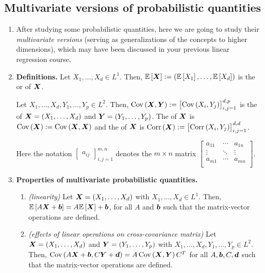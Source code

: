 \subsection{Multivariate versions of probabilistic quantities}
\label{subsect:multivar-prob-quant}
\begin{enumerate}
\item After studying some probabilistic quantities, here we are going to study
their \emph{multivariate versions} (serving as generalizations of the concepts
to higher dimensions), which may have been discussed in your previous linear
regression course.
\item \textbf{Definitions.} Let \(X_1,\dotsc,X_d\in L^{1}\). Then,
\(\mathbb{E}\left[\bm{X}\right]:=(\mathbb{E}\left[X_1\right],\dotsc,\mathbb{E}\left[X_d\right])\) is the 
or  of \(\bm{X}\).

Let \(X_1,\dotsc,X_d,Y_1,\dotsc,Y_p\in L^{2}\). Then,
\(\operatorname{Cov}\left(\bm{X},\bm{Y}\right)
:=\begin{bmatrix}\operatorname{Cov}\left(X_i,Y_j\right)\end{bmatrix}_{i,j=1}^{d,p}\) is the
 of \(\bm{X}=(X_1,\dotsc,X_d)\) and
\(\bm{Y}=(Y_1,\dotsc,Y_p)\). The  of \(\bm{X}\) is
\(\operatorname{Cov}\left(\bm{X}\right):=\operatorname{Cov}\left(\bm{X},\bm{X}\right)\) and the  of \(\bm{X}\)
is \(\operatorname{Corr}\left(\bm{X}\right):=\begin{bmatrix}\operatorname{Corr}\left(X_i,Y_j\right)\end{bmatrix}_{i,j=1}^{d,d}\).
\begin{note}
Here the notation \(\begin{bmatrix}a_{ij}\end{bmatrix}_{i,j=1}^{m,n}\) denotes
the \(m\times n\) matrix \(\begin{bmatrix}
a_{11}&\cdots&a_{1n}\\
\vdots&\ddots&\vdots\\
a_{m1}&\cdots&a_{mn}\\
\end{bmatrix}\).
\end{note}
\item\label{it:mult-var-prob-quant-prop} \textbf{Properties of multivariate
probabilistic quantities.}
\begin{enumerate}
\item\label{it:mean-vec-linearity} \emph{(linearity)} Let \(\bm{X}=(X_1,\dotsc,X_d)\)
with \(X_1,\dotsc,X_d\in L^{1}\).
Then, \(\mathbb{E}\left[A\bm{X}+\bm{b}\right]=A\mathbb{E}\left[\bm{X}\right]+\bm{b}\), for all \(A\) and
\(\bm{b}\) such that the matrix-vector operations are defined.
\item\label{it:lin-cross-cov} \emph{(effects of linear operations on cross-covariance matrix)} Let
\(\bm{X}=(X_1,\dotsc,X_d)\) and \(\bm{Y}=(Y_1,\dotsc,Y_p)\) with
\(X_1,\dotsc,X_d,Y_1,\dotsc,Y_p\in L^{2}\). Then,
\(\operatorname{Cov}\left(A\bm{X}+\bm{b},C\bm{Y}+\bm{d}\right)=A\operatorname{Cov}\left(\bm{X},\bm{Y}\right)C^{T}\)
for all \(A,\bm{b},C,\bm{d}\) such that the matrix-vector operations are
defined.


\end{enumerate}
\end{enumerate}
